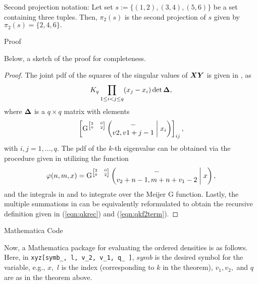 Second projection notation: Let set $s := \{(1,2), (3,4), (5,6)\}$ be a set containing three tuples. Then, $\pi_2(s)$ is the second projection of $s$ given by $\pi_2(s) = \{2, 4, 6\}.$

Proof

Below, a sketch of the proof for completeness.

\begin{proof}
	The joint pdf of the squares of the singular values of $\boldsymbol{X}\boldsymbol{Y}$ is given in \cite[(18)]{Akemann2013},\cite{Ipsen2015} as
	\begin{align}
		K_q \prod_{1\leq i < j \leq q} (x_j-x_i) \det{\boldsymbol{\Delta}},
	\end{align}
	where $\boldsymbol{\Delta}$ is a $q \times q$ matrix with elements
	\begin{equation}
		\left[\mathrm{G}^{\tiny\begin{bmatrix} 2&0\\0&2 \end{bmatrix}}\left(\begin{matrix} - \\ v2,v1+j-1 \end{matrix}\;\middle|\;x_i\right)\right]_{ij},
	\end{equation}
	with $i,j=1,\dots,q.$ The pdf of the $k$-th eigenvalue can be obtained via the procedure given in \cite[Sec. IV-B]{Zanella2009} utilizing the function
	\begin{equation}
		\varphi(n,m,x) = \mathrm{G}^{\tiny\begin{bmatrix} 2&0\\0&2 \end{bmatrix}}\left(\begin{matrix} - \\ v_2+n-1, m+n+v_1-2 \end{matrix}\;\middle|\;x\right),
	\end{equation}
	and the integrals in \cite[(A7)]{Akemann2013} and \cite{Olver2010} to integrate over the Meijer G function. Lastly, the multiple summations in \cite[Sec. IV-B]{Zanella2009} can be equivalently reformulated to obtain the recursive definition given in (\ref{eqn:qkrec}) and (\ref{eqn:qkf2term}).
\end{proof}

Mathematica Code

Now, a Mathematica package for evaluating the ordered densities is as follows. Here, in \verb!xyz[symb_, l, v_2, v_1, q_ ]!, $symb$ is the desired symbol for the variable, e.g., $x,$ $l$ is the index (corresponding to $k$ in the theorem), $v_1, v_2,$ and $q$ are as in the theorem above.

